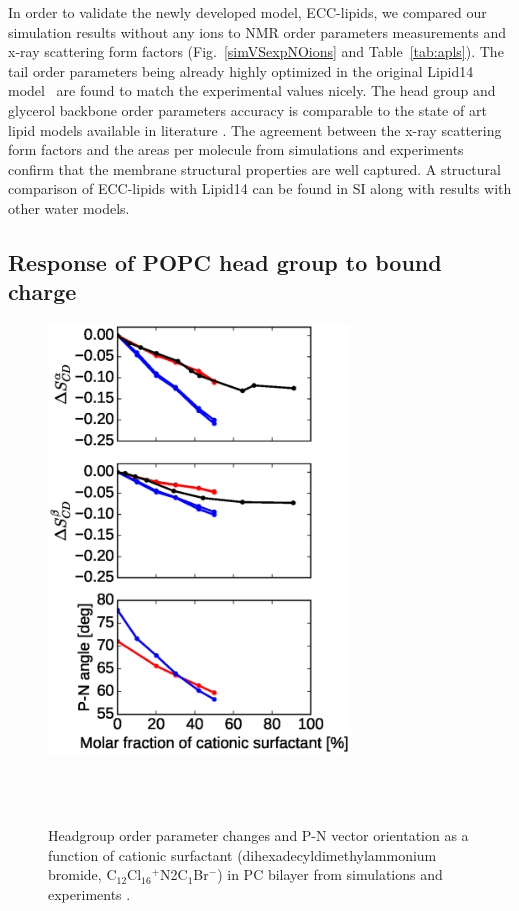 \documentclass[aip,jcp,twocolumn]{revtex4}
\begin{document}
In order to validate the newly developed model, ECC-lipids, 
we compared our simulation results without any ions to
NMR order parameters measurements and x-ray scattering form factors 
(Fig.~\ref{simVSexpNOions} and Table~\ref{tab:apls}). 
The tail order parameters being already highly optimized in the original Lipid14 model~\cite{dickson14}
are found to match the experimental values nicely.
The head group and glycerol backbone order parameters accuracy is 
comparable to the state of art lipid models available in literature \cite{ollila16}.
The agreement between the x-ray scattering form factors and the areas per molecule from simulations and experiments
confirm that the membrane structural properties are well captured. 
A structural comparison of ECC-lipids with Lipid14 can be found 
in SI along with results with other water models. 

\subsection{Response of POPC head group to bound charge}

\begin{figure}[tbp]
  \centering
  \includegraphics[width=8.0cm]{../Fig/ipython_nb/PN_angle_OrdPars-A-B_L14-ECCL17_q80_sig89_surf.eps}
  \caption{\label{OrderParameterCHANGESsurf}
    Headgroup order parameter changes and P-N vector orientation as a function of
    cationic surfactant (dihexadecyldimethylammonium bromide, C$_{12}$Cl$_{16}$$^+$N2C$_1$Br$^-$)
    in PC bilayer from simulations and experiments \cite{scherer89}.
  }
   \\
   \\
\end{figure}
\end{document}
